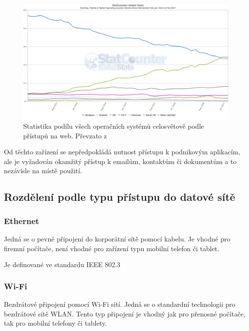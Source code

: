 \begin{figure}[h]
\includegraphics[width=13cm]{img/StatCounter_All_Worldwide}
\caption{Statistika podílu všech operačních systémů celosvětově podle přístupů na web. Převzato z \cite{http://gs.statcounter.com/os-market-share/}} 
\centering
\end{figure}
 
Od těchto zařízení se nepředpokládá nutnost přístupu k podnikovým aplikacím, ale je vyžadován okamžitý přístup k emailům, kontaktům či dokumentům a to nezávisle na místě použití.
 
 
 \subsection{Rozdělení podle typu přístupu do datové sítě}
 \subsubsection{Ethernet}
 Jedná se o pevné připojení do korporátní sítě pomocí kabelu. Je vhodné pro firemní počítače, není vhodné pro zařízení typu mobilní telefon či tablet.
 
 Je definované ve standardu IEEE 802.3 
 
 \subsubsection{Wi-Fi} 
 
 Bezdrátové připojení pomocí Wi-Fi sítí. Jedná se o standardní technologii pro bezdrátové sítě WLAN. Tento typ připojení je vhodný jak pro přenosné počítače, tak pro mobilní telefony či tablety.
 
